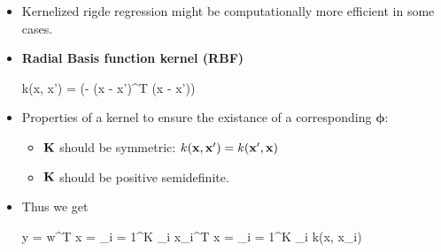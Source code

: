 \begin{itemize}
\begin{itemize}
	\end{itemize}
	\item Kernelized rigde regression might be computationally more efficient in some cases.
	\item \textbf{Radial Basis function kernel (RBF)}
	\begin{myalign*}
	     k(\*x, \*x') = \exp(- (\*x - \*x')^T (\*x - \*x'))
	 \end{myalign*} 
	\item Properties of a kernel to ensure the existance of a corresponding $\bm \phi$:
	\begin{itemize}
		\item $\mathbf{K}$ should be symmetric: $k(\mathbf{x}, \mathbf{x}') = k(\mathbf{x}', \mathbf{x})$
		\item $\mathbf{K}$ should be positive semidefinite.
	\end{itemize}
	\item Thus we get
	\begin{myalign*}
	    \*y = \bm w^T \*x = \sum_{i = 1}^K \alpha_i \*x_i^T \*x = \sum_{i = 1}^K \alpha_i k(\*x, \*x_i) 
	\end{myalign*}
\end{itemize}


